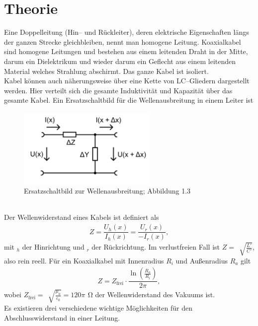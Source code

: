 \documentclass[a4paper,10pt]{article}
\numberwithin{equation}{section}
\begin{document}
\section{Theorie}
Eine Doppelleitung (Hin-- und Rückleiter), deren elektrische Eigenschaften längs der ganzen Strecke gleichbleiben, nennt man homogene Leitung.
Koaxialkabel sind homogene Leitungen und bestehen aus einem leitenden Draht in der Mitte, darum ein Dielektrikum und wieder darum ein Geflecht aus einem leitenden Material welches Strahlung abschirmt.
Das ganze Kabel ist isoliert.
\\\indent Kabel können auch näherungsweise über eine Kette von LC--Gliedern dargestellt werden.
Hier verteilt sich die gesamte Induktivität und Kapazität über das gesamte Kabel.
Ein Ersatzschaltbild für die Wellenausbreitung in einem Leiter ist
\begin{figure}[h]
        \centering
        \includegraphics[width=0.6\textwidth]{ersatz_wellenausbreitung.png}
        \caption{Ersatzschaltbild zur Wellenausbreitung; Abbildung 1.3 \cite{Praktikumsanleitung}}
\end{figure}\\
Der Wellenwiderstand eines Kabels ist definiert als 
\begin{align} 
        Z=\dfrac{U_h\left(x\right)}{I_h\left(x\right)}=\dfrac{U_r\left(x\right)}{-I_r\left(x\right)}
,\end{align} 
mit $_h$ der Hinrichtung und $_r$ der Rückrichtung.
Im verlustfreien Fall ist $Z=\,\sqrt[]{\tfrac{L'}{C'}}$, also rein reell.
Für ein Koaxialkabel mit Innenradius $R_i$ und Außenradius $R_a$ gilt
\begin{align} 
        Z=Z_\text{frei}\cdot \dfrac{\ln\left(\tfrac{R_a}{R_i}\right)}{2\pi }
,\end{align} 
wobei $Z_\text{frei}=\,\sqrt[]{\tfrac{\mu _0}{\varepsilon _0}}=120\pi \,\SI{}{\ohm}$ der Wellenwiderstand des Vakuums ist.
\\\indent Es existieren drei verschiedene wichtige Möglichkeiten für den Abschlusswiderstand in einer Leitung.
\end{document}
